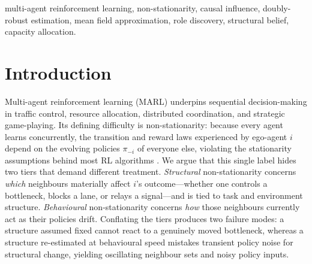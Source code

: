 \documentclass[conference]{IEEEtran}
\begin{document}
\begin{IEEEkeywords}
multi-agent reinforcement learning, non-stationarity, causal influence, doubly-robust estimation, mean field approximation, role discovery, structural belief, capacity allocation.
\end{IEEEkeywords}

\section{Introduction}

Multi-agent reinforcement learning (MARL) underpins sequential decision-making in traffic control, resource allocation, distributed coordination, and strategic game-playing. Its defining difficulty is non-stationarity: because every agent learns concurrently, the transition and reward laws experienced by ego-agent $i$ depend on the evolving policies $\pi_{-i}$ of everyone else, violating the stationarity assumptions behind most RL algorithms \cite{yang2018mfmarl, busoniu2008survey, papoudakis2019nonstationarity}. We argue that this single label hides two tiers that demand different treatment. \emph{Structural} non-stationarity concerns \emph{which} neighbours materially affect $i$'s outcome---whether one controls a bottleneck, blocks a lane, or relays a signal---and is tied to task and environment structure. \emph{Behavioural} non-stationarity concerns \emph{how} those neighbours currently act as their policies drift. Conflating the tiers produces two failure modes: a structure assumed fixed cannot react to a genuinely moved bottleneck, whereas a structure re-estimated at behavioural speed mistakes transient policy noise for structural change, yielding oscillating neighbour sets and noisy policy inputs.
\end{document}
